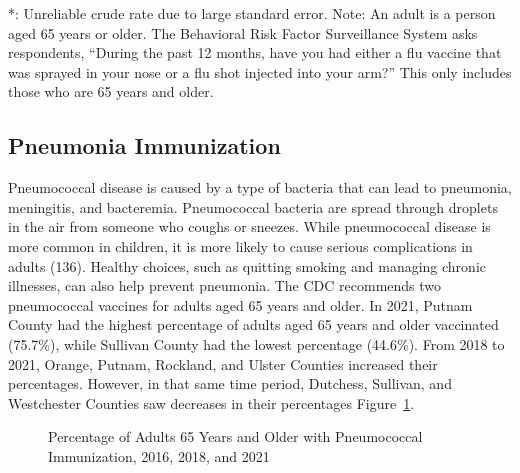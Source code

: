 \documentclass[
  english,
  letterpaper,
]{report}
\begin{document}
\begin{tcolorbox}[enhanced jigsaw, breakable, leftrule=.75mm, title=\textcolor{quarto-callout-note-color}{\faInfo}\hspace{0.5em}{Note}, bottomrule=.15mm, opacityback=0, left=2mm, colback=white, bottomtitle=1mm, coltitle=black, colbacktitle=quarto-callout-note-color!10!white, colframe=quarto-callout-note-color-frame, opacitybacktitle=0.6, toptitle=1mm, titlerule=0mm, arc=.35mm, rightrule=.15mm, toprule=.15mm]

*: Unreliable crude rate due to large standard error. Note: An adult is
a person aged 65 years or older. The Behavioral Risk Factor Surveillance
System asks respondents, ``During the past 12 months, have you had
either a flu vaccine that was sprayed in your nose or a flu shot
injected into your arm?'' This only includes those who are 65 years and
older.

\end{tcolorbox}

\subsection{Pneumonia Immunization}\label{pneumonia-immunization}

Pneumococcal disease is caused by a type of bacteria that can lead to
pneumonia, meningitis, and bacteremia. Pneumococcal bacteria are spread
through droplets in the air from someone who coughs or sneezes. While
pneumococcal disease is more common in children, it is more likely to
cause serious complications in adults (136). Healthy choices, such as
quitting smoking and managing chronic illnesses, can also help prevent
pneumonia. The CDC recommends two pneumococcal vaccines for adults aged
65 years and older. In 2021, Putnam County had the highest percentage of
adults aged 65 years and older vaccinated (75.7\%), while Sullivan
County had the lowest percentage (44.6\%). From 2018 to 2021, Orange,
Putnam, Rockland, and Ulster Counties increased their percentages.
However, in that same time period, Dutchess, Sullivan, and Westchester
Counties saw decreases in their percentages
Figure~\ref{fig-65-pneumo-immi-percent}.

\begin{figure}


\caption{\label{fig-65-pneumo-immi-percent}Percentage of Adults 65 Years
and Older with Pneumococcal Immunization, 2016, 2018, and 2021}

\end{figure}%
\end{document}
